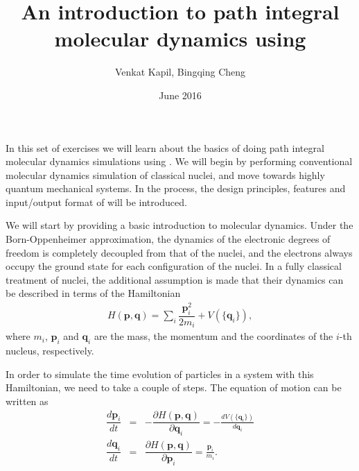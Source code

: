\documentclass{article}
\title{An introduction to path integral \\molecular dynamics using \ipi{}}
\author{Venkat Kapil, Bingqing Cheng}
\date{June 2016}
\begin{document}
\maketitle

In this set of exercises we will learn 
about the basics of doing path integral 
molecular dynamics simulations using \ipi{}. 
We will begin by performing conventional
molecular dynamics simulation of classical nuclei,
and move towards highly quantum mechanical systems.
In the process, the design principles, 
features and input/output format of \ipi{} 
will be introduced.

\begin{Exercise}[label={i-pi},title={Molecular Dynamics: a client/server approach}]

We will start by providing a basic introduction to molecular dynamics.
Under the Born-Oppenheimer
approximation, the dynamics of the electronic
degrees of freedom is completely decoupled from that of the nuclei, and the electrons always
occupy the ground state for each configuration of the nuclei. 
In a fully classical treatment of nuclei, the
additional assumption is made that their 
dynamics can be described in terms of the 
Hamiltonian
\begin{eqnarray}
    H(\textbf{p},\textbf{q})=\sum_i \dfrac{\textbf{p}_i^2}{2 m_i} + V(\{\textbf{q}_i\}),
\end{eqnarray}
where $m_i$, $\textbf{p}_i$ and $\textbf{q}_i$ 
are the mass, the momentum and the coordinates of the $i$-th nucleus, respectively.

In order to simulate the time evolution of particles in a system
with this Hamiltonian, we need to take a couple of steps.
The equation of motion can be written as
\begin{eqnarray}
   \dfrac{d \textbf{p}_i}{d t}&=& 
   - \dfrac{\partial H(\textbf{p},\textbf{q})}{\partial \textbf{q}_i}=-\frac{d V(\{\textbf{q}_i\})}{d\textbf{q}_i} \\
   \dfrac{d \textbf{q}_i}{d t}&=& 
   \dfrac{\partial H(\textbf{p},\textbf{q})}{\partial \textbf{p}_i} = \frac{\textbf{p}_i}{m_i}.
\end{eqnarray}


\end{Exercise}
\end{document}
